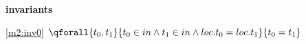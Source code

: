 \textbf{invariants}
\begin{block}
\item[ \eqref{m2:inv0} ]$\qforall{t_0,t_1}{t_0 \in in \land t_1 \in in \land loc.t_0 = loc.t_1}{t_0 = t_1}	$ %
\end{block}
